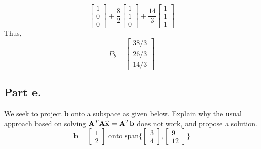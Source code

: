 \begin{mdframed}[style=MyFrame]
\begin{equation}
\begin{bmatrix}
                1       \\
                0       \\
                0
            \end{bmatrix}
            +
            \frac{8}{2}
            \begin{bmatrix}
                1       \\
                1       \\
                0
            \end{bmatrix}
            +
            \frac{14}{3}
            \begin{bmatrix}
                1       \\
                1       \\
                1
            \end{bmatrix}
    \end{equation}
    Thus,
    \begin{equation}
        P_{b} =
        \begin{bmatrix}
            38/3    \\
            26/3    \\
            14/3
        \end{bmatrix}
    \end{equation}
\end{mdframed}
\subsection{Part e.}
We seek to project $\mathbf{b}$ onto a subspace as given below. Explain why
the usual approach based on solving $\mathbf{A}^{T} \mathbf{A} \widehat{\mathbf{x}} =
\mathbf{A}^{T} \mathbf{b}$ does not work, and propose a solution.
\begin{equation}
    \mathbf{b} =
    \begin{bmatrix}
        1   \\
        2
    \end{bmatrix}
    \text{ onto span}
    \Bigg\{
        \begin{bmatrix}
            3   \\
            4
        \end{bmatrix}
        ,
        \begin{bmatrix}
            9   \\
            12
        \end{bmatrix}
        \Bigg\}
\end{equation}
